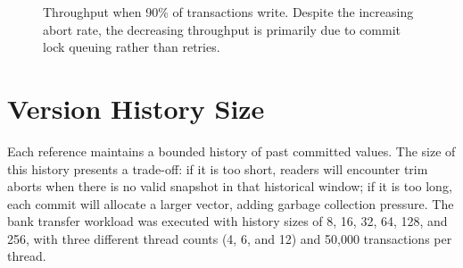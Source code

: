 \begin{figure}[H]
  \centering
  \caption{Throughput when 90\% of transactions write. Despite the
    increasing abort rate, the decreasing throughput is primarily due to
    commit lock queuing rather than retries.}
  \label{fig:throughput-write-heavy}
\end{figure}

\section{Version History Size}
\label{sec:history-sweep}

Each reference maintains a bounded history of past committed values.
The size of this history presents a trade-off: if it is too short, readers
will encounter trim aborts when there is no valid snapshot in that
historical window; if it is too long, each commit will allocate a larger
vector, adding garbage collection pressure. The bank transfer workload
was executed with history sizes of 8, 16, 32, 64, 128, and 256, with
three different thread counts (4, 6, and 12) and 50,000 transactions
per thread.

